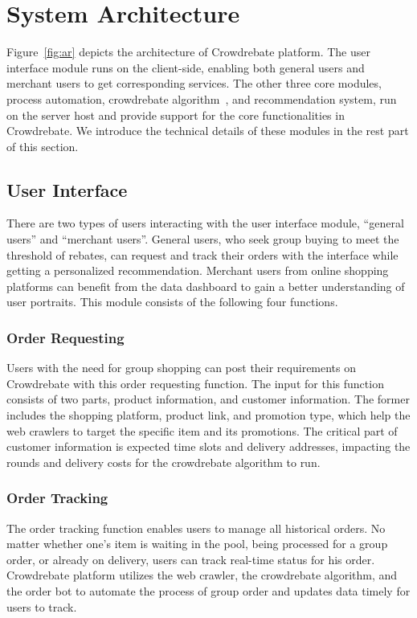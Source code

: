 \section{System Architecture}

Figure~\ref{fig:ar} depicts the architecture of Crowdrebate platform. The user interface module runs on the client-side, enabling both general users and merchant users to get corresponding services. The other three core modules, process automation, crowdrebate algorithm~\cite{Report}, and recommendation system, run on the server host and provide support for the core functionalities in Crowdrebate. We introduce the technical details of these modules in the rest part of this section.

\subsection{User Interface}

There are two types of users interacting with the user interface module, ``general users'' and ``merchant users''. General users, who seek group buying to meet the threshold of rebates, can request and track their orders with the interface while getting a personalized recommendation. Merchant users from online shopping platforms can benefit from the data dashboard to gain a better understanding of user portraits. This module consists of the following four functions.

\subsubsection{Order Requesting}

Users with the need for group shopping can post their requirements on Crowdrebate with this order requesting function. The input for this function consists of two parts, product information, and customer information. The former includes the shopping platform, product link, and promotion type, which help the web crawlers to target the specific item and its promotions. The critical part of customer information is expected time slots and delivery addresses, impacting the rounds and delivery costs for the crowdrebate algorithm to run.

\subsubsection{Order Tracking}

The order tracking function enables users to manage all historical orders. No matter whether one's item is waiting in the pool, being processed for a group order, or already on delivery, users can track real-time status for his order. Crowdrebate platform utilizes the web crawler, the crowdrebate algorithm, and the order bot to automate the process of group order and updates data timely for users to track.
	
